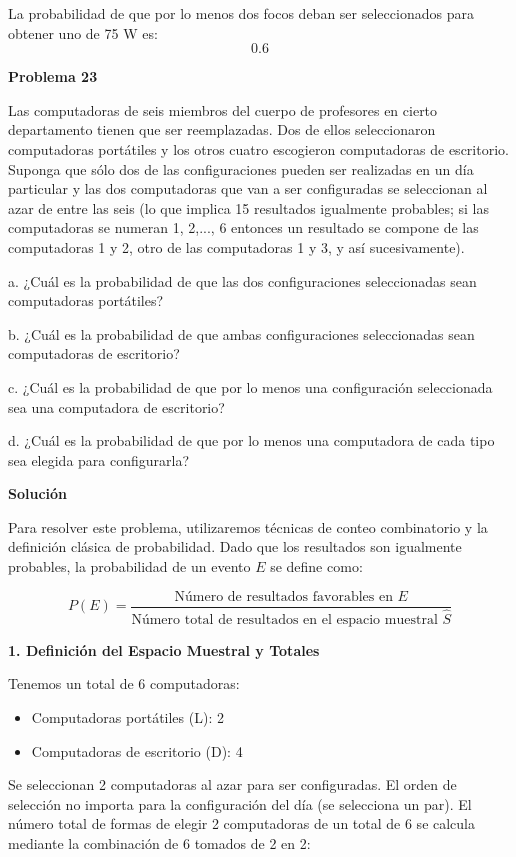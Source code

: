 \documentclass[a4paper]{article}
\begin{document}
La probabilidad de que por lo menos dos focos deban ser seleccionados para obtener uno de 75 W es:
$$ 0.6 $$

\textbf{Problema 23}

Las computadoras de seis miembros del cuerpo de profesores en cierto departamento tienen que ser reemplazadas. Dos de ellos seleccionaron computadoras portátiles y los otros cuatro escogieron computadoras de escritorio. Suponga que sólo dos de las configuraciones pueden ser realizadas en un día particular y las dos computadoras que van a ser configuradas se seleccionan al azar de entre las seis (lo que implica 15 resultados igualmente probables; si las computadoras se numeran 1, 2,..., 6 entonces un resultado se compone de las computadoras 1 y 2, otro de las computadoras 1 y 3, y así sucesivamente).

a. ¿Cuál es la probabilidad de que las dos configuraciones seleccionadas sean computadoras portátiles?

b. ¿Cuál es la probabilidad de que ambas configuraciones seleccionadas sean computadoras de escritorio?

c. ¿Cuál es la probabilidad de que por lo menos una configuración seleccionada sea una computadora de escritorio?

d. ¿Cuál es la probabilidad de que por lo menos una computadora de cada tipo sea elegida para configurarla?

\vspace{0.5cm}

\textbf{Solución}

Para resolver este problema, utilizaremos técnicas de conteo combinatorio y la definición clásica de probabilidad. Dado que los resultados son igualmente probables, la probabilidad de un evento $E$ se define como:

$$ P(E) = \frac{\text{Número de resultados favorables en } E}{\text{Número total de resultados en el espacio muestral } \hat{S}} $$

\textbf{1. Definición del Espacio Muestral y Totales}

Tenemos un total de 6 computadoras:
\begin{itemize}
    \item Computadoras portátiles (L): 2
    \item Computadoras de escritorio (D): 4
\end{itemize}

Se seleccionan 2 computadoras al azar para ser configuradas. El orden de selección no importa para la configuración del día (se selecciona un par). El número total de formas de elegir 2 computadoras de un total de 6 se calcula mediante la combinación de 6 tomados de 2 en 2:
\end{document}
